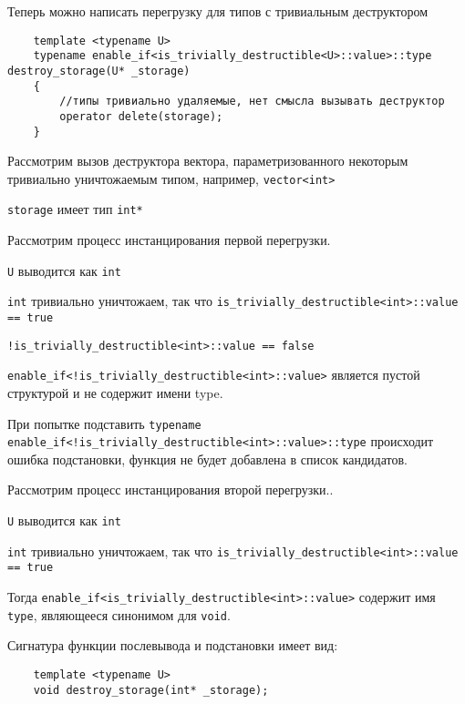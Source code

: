 	Теперь можно написать перегрузку для типов с тривиальным деструктором

	\begin{verbatim}
	template <typename U>
	typename enable_if<is_trivially_destructible<U>::value>::type destroy_storage(U* _storage)
	{
	    //типы тривиально удаляемые, нет смысла вызывать деструктор
	    operator delete(storage);
	}
	\end{verbatim}
	
	Рассмотрим вызов деструктора вектора, параметризованного некоторым тривиально уничтожаемым типом, например, \texttt{vector<int>}
	
	\texttt{storage} имеет тип \texttt{int*}
	
	Рассмотрим процесс инстанцирования первой перегрузки.
	
	\texttt{U} выводится как \texttt{int}
	
	\texttt{int} тривиально уничтожаем, так что \texttt{is_trivially_destructible<int>::value == true}
	
	\texttt{!is_trivially_destructible<int>::value == false}
	
	\texttt{enable_if<!is_trivially_destructible<int>::value>} является пустой структурой и не содержит имени type.
	
	При попытке подставить \texttt{typename enable_if<!is_trivially_destructible<int>::value>::type} происходит ошибка подстановки, функция не будет добавлена в список кандидатов.
	
	\vspace{\baselineskip}		
	
	Рассмотрим процесс инстанцирования второй перегрузки..
	
	\texttt{U} выводится как \texttt{int}
	
	\texttt{int} тривиально уничтожаем, так что \texttt{is_trivially_destructible<int>::value == true}
	
	Тогда \texttt{enable_if<is_trivially_destructible<int>::value>} содержит имя \texttt{type}, являющееся синонимом для \texttt{void}.
	
	Сигнатура функции послевывода и подстановки имеет вид:
	
	\begin{verbatim}
	template <typename U>
	void destroy_storage(int* _storage);
	\end{verbatim}
	
